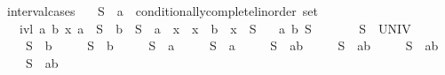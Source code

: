\begin{isabellebody}
\isanewline
{}\isamarkupfalse%
%
\endisatagproof
{\isafoldproof}%
%
\isadelimproof
\isanewline
%
\endisadelimproof
{}\isamarkupfalse%
\isanewline
\isanewline
{}\isamarkupfalse%
\ interval{\isacharunderscore}{\kern0pt}cases{\isacharcolon}{\kern0pt}\isanewline
\ \ \ S\ {\isacharcolon}{\kern0pt}{\isacharcolon}{\kern0pt}\ {\isachardoublequoteopen}{\isacharprime}{\kern0pt}a\ {\isacharcolon}{\kern0pt}{\isacharcolon}{\kern0pt}\ conditionally{\isacharunderscore}{\kern0pt}complete{\isacharunderscore}{\kern0pt}linorder\ set{\isachardoublequoteclose}\isanewline
\ \ \ ivl{\isacharcolon}{\kern0pt}\ {\isachardoublequoteopen}{\isasymAnd}a\ b\ x{\isachardot}{\kern0pt}\ a\ {\isasymin}\ S\ {\isasymLongrightarrow}\ b\ {\isasymin}\ S\ {\isasymLongrightarrow}\ a\ {\isasymle}\ x\ {\isasymLongrightarrow}\ x\ {\isasymle}\ b\ {\isasymLongrightarrow}\ x\ {\isasymin}\ S{\isachardoublequoteclose}\isanewline
\ \ \ {\isachardoublequoteopen}{\isasymexists}a\ b{\isachardot}{\kern0pt}\ S\ {\isacharequal}{\kern0pt}\ {\isacharbraceleft}{\kern0pt}{\isacharbraceright}{\kern0pt}\ {\isasymor}\isanewline
\ \ \ \ S\ {\isacharequal}{\kern0pt}\ UNIV\ {\isasymor}\isanewline
\ \ \ \ S\ {\isacharequal}{\kern0pt}\ {\isacharbraceleft}{\kern0pt}{\isachardot}{\kern0pt}{\isachardot}{\kern0pt}{\isacharless}{\kern0pt}b{\isacharbraceright}{\kern0pt}\ {\isasymor}\isanewline
\ \ \ \ S\ {\isacharequal}{\kern0pt}\ {\isacharbraceleft}{\kern0pt}{\isachardot}{\kern0pt}{\isachardot}{\kern0pt}b{\isacharbraceright}{\kern0pt}\ {\isasymor}\isanewline
\ \ \ \ S\ {\isacharequal}{\kern0pt}\ {\isacharbraceleft}{\kern0pt}a{\isacharless}{\kern0pt}{\isachardot}{\kern0pt}{\isachardot}{\kern0pt}{\isacharbraceright}{\kern0pt}\ {\isasymor}\isanewline
\ \ \ \ S\ {\isacharequal}{\kern0pt}\ {\isacharbraceleft}{\kern0pt}a{\isachardot}{\kern0pt}{\isachardot}{\kern0pt}{\isacharbraceright}{\kern0pt}\ {\isasymor}\isanewline
\ \ \ \ S\ {\isacharequal}{\kern0pt}\ {\isacharbraceleft}{\kern0pt}a{\isacharless}{\kern0pt}{\isachardot}{\kern0pt}{\isachardot}{\kern0pt}{\isacharless}{\kern0pt}b{\isacharbraceright}{\kern0pt}\ {\isasymor}\isanewline
\ \ \ \ S\ {\isacharequal}{\kern0pt}\ {\isacharbraceleft}{\kern0pt}a{\isacharless}{\kern0pt}{\isachardot}{\kern0pt}{\isachardot}{\kern0pt}b{\isacharbraceright}{\kern0pt}\ {\isasymor}\isanewline
\ \ \ \ S\ {\isacharequal}{\kern0pt}\ {\isacharbraceleft}{\kern0pt}a{\isachardot}{\kern0pt}{\isachardot}{\kern0pt}{\isacharless}{\kern0pt}b{\isacharbraceright}{\kern0pt}\ {\isasymor}\isanewline
\ \ \ \ S\ {\isacharequal}{\kern0pt}\ {\isacharbraceleft}{\kern0pt}a{\isachardot}{\kern0pt}{\isachardot}{\kern0pt}b{\isacharbraceright}{\kern0pt}{\isachardoublequoteclose}\isanewline

\end{isabellebody}
